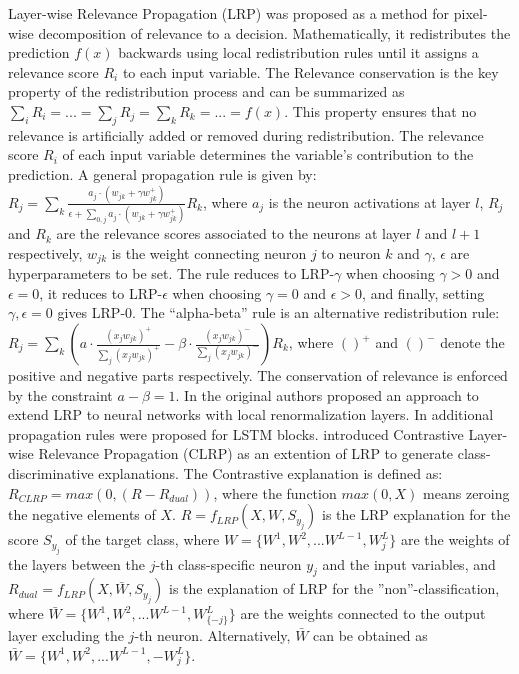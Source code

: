 \documentclass[journal]{IEEEtran}
\begin{document}
Layer-wise Relevance Propagation (LRP) \cite{Bach2015} \cite{Montavon2018} \cite{Montavon2019} was proposed as a method for pixel-wise decomposition of relevance to a decision. Mathematically, it redistributes the prediction $f(x)$ backwards using local redistribution rules until it assigns a relevance score $R_i$ to each input variable. The Relevance conservation is the key property of the redistribution process and can be summarized as $\sum_iR_i=...=\sum_jR_j=\sum_kR_k=...=f(x)$. This property ensures that no relevance is artificially added or removed during redistribution. The relevance score $R_i$ of each input variable determines the variable's contribution to the prediction. A general propagation rule is given by: $R_j=\sum_k \frac{a_j \cdot (w_{jk}+\gamma w_{jk}^+)}{\epsilon + \sum_{0,j}a_j \cdot (w_{jk}+\gamma w_{jk}^+)}R_k$, where $a_j$ is the neuron activations at layer $l$, $R_j$ and $R_k$ are the relevance scores associated to the neurons at layer $l$ and $l+1$ respectively, $w_{jk}$ is the weight connecting neuron $j$ to neuron $k$ and $\gamma$, $\epsilon$ are hyperparameters to be set. The rule reduces to LRP-$\gamma$ when choosing $\gamma >0$ and $\epsilon =0$, it reduces to LRP-$\epsilon$ when choosing $\gamma =0$ and $\epsilon >0$, and finally, setting $\gamma,\epsilon =0$ gives LRP-$0$. The “alpha-beta” rule is an alternative redistribution rule: $R_j=\sum_k \left ( a \cdot \frac{(x_jw_{jk})^+}{\sum_j(x_jw_{jk})^+}-\beta \cdot \frac{(x_jw_{jk})^-}{\sum_j(x_jw_{jk})^-} \right )R_k$, where $()^+$ and $()^-$ denote the positive and negative parts respectively. The conservation of relevance is enforced by the constraint $a-\beta=1$. In \cite{Binder2016} the original authors proposed an approach to extend LRP to neural networks with local renormalization layers. In \cite{Arras2018} \cite{Arras2019} additional propagation rules were proposed for LSTM blocks.
\cite{Gu2019} introduced Contrastive Layer-wise Relevance Propagation (CLRP) as an extention of LRP to generate class-discriminative explanations. The Contrastive explanation is defined as: $R_{CLRP}=max(0,(R-R_{dual}))$, where the function $max(0,X)$ means zeroing the negative elements of $X$. $R=f_{LRP}(X,W,S_{y_j})$ is the LRP explanation for the score $S_{y_j}$ of the target class, where $W=\{W^1,W^2,...W^{L-1},W^L_{j}\}$ are the weights of the layers between the $j$-th class-specific neuron $y_j$ and the input variables, and $R_{dual}=f_{LRP}(X,\bar{W},S_{y_j})$ is the explanation of LRP for the ''non''-classification, where $\bar{W}=\{W^1,W^2,...W^{L-1},W^L_{\{-j\}}\}$ are the weights connected to the output layer excluding the $j$-th neuron. Alternatively, $\bar{W}$ can be obtained as $\bar{W}=\{W^1,W^2,...W^{L-1},-W^L_j\}$.
\end{document}
